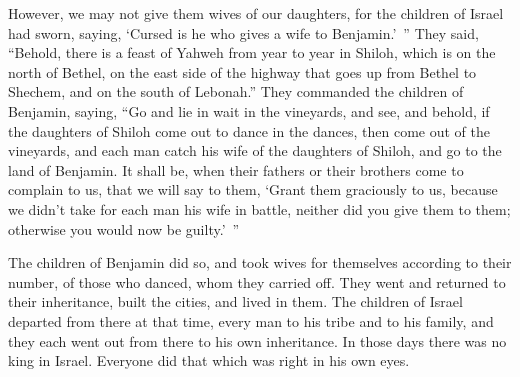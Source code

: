 {However, we may not give them wives of our daughters, for the children of Israel had sworn, saying, ‘Cursed is he who gives a wife to Benjamin.’ ”
They said, “Behold, there is a feast of Yahweh from year to year in Shiloh, which is on the north of Bethel, on the east side of the highway that goes up from Bethel to Shechem, and on the south of Lebonah.”
They commanded the children of Benjamin, saying, “Go and lie in wait in the vineyards,
and see, and behold, if the daughters of Shiloh come out to dance in the dances, then come out of the vineyards, and each man catch his wife of the daughters of Shiloh, and go to the land of Benjamin.
It shall be, when their fathers or their brothers come to complain to us, that we will say to them, ‘Grant them graciously to us, because we didn’t take for each man his wife in battle, neither did you give them to them; otherwise you would now be guilty.’ ”
\par }{\PP {}The children of Benjamin did so, and took wives for themselves according to their number, of those who danced, whom they carried off. They went and returned to their inheritance, built the cities, and lived in them.
The children of Israel departed from there at that time, every man to his tribe and to his family, and they each went out from there to his own inheritance.
In those days there was no king in Israel. Everyone did that which was right in his own eyes.
\par }